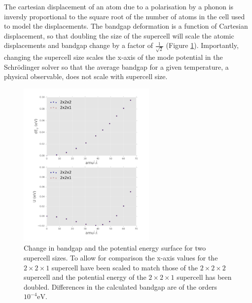 
The cartesian displacement of an atom due to a polarisation by a phonon is inversly proportional to the square root of the number of atoms in the cell used to model the displacements.\autocite{Whalley2016} The bandgap deformation is a function of Cartesian displacement, so that doubling the size of the supercell will scale the atomic displacements and bandgap change by a factor of $\frac{1}{\sqrt{2}}$ (Figure \ref{ch5scaling}). 
Importantly, changing the supercell size scales the x-axis of the mode potential in the Schr\"{o}dinger solver so that the average bandgap for a given temperature, a physical observable, does not scale with supercell size.

\begin{figure}[h!]
\includegraphics[width=0.6\textwidth]{figures/ch5/SCcompare.png} \centering
\caption[Bandgap deformation potential and supercell size]{\label{ch5scaling}
Change in bandgap and the potential energy surface for two supercell sizes. To allow for comparison the x-axis values for the $2\times2\times1$ supercell have been scaled to match those of the $2\times2\times2$ supercell and the potential energy of the $2\times2\times1$ supercell has been doubled.  Differences in the calculated bandgap are of the orders $10^{−4}\! \textrm{eV}$.
}
\end{figure}

